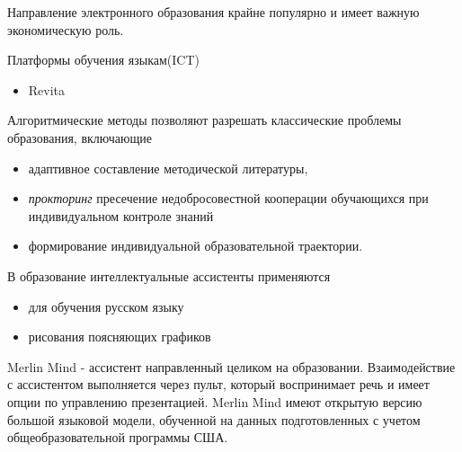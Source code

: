 Направление электронного образования крайне популярно и имеет важную экономическую роль.


Платформы обучения языкам(ICT) \begin{itemize}
    \item Revita \cite{katinskaia2018revita}
\end{itemize}


Алгоритмические методы позволяют разрешать классические проблемы образования, включающие \begin{itemize}
    \item адаптивное составление методической литературы,
    \item \textit{прокторинг} пресечение недобросовестной кооперации обучающихся при  индивидуальном контроле знаний 
    \item формирование индивидуальной образовательной траектории.
\end{itemize}

В образование интеллектуальные ассистенты применяются \begin{itemize}
    \item  для обучения русском языку \cite{аль2019интеллектуальный}
    \item рисования поясняющих графиков \cite{bulusuautomated}
\end{itemize}



Merlin Mind - ассистент направленный целиком на образовании. Взаимодействие с ассистентом выполняется через пульт, который воспринимает речь и имеет опции по управлению презентацией.
Merlin Mind имеют открытую версию большой языковой модели, обученной на данных подготовленных с учетом общеобразовательной программы США.
